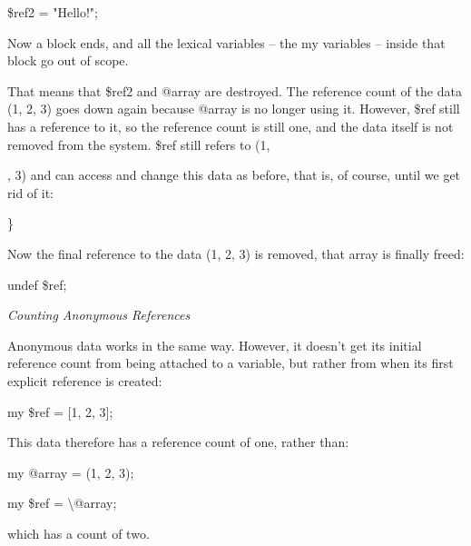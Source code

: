 \documentclass[a4paper,11pt]{book}
\begin{document}
\noindent 

\noindent \$ref2 = "Hello!";

\noindent 

\noindent 

\noindent Now a block ends, and all the lexical variables -- the my variables -- inside that block go out of scope.

\noindent That means that \$ref2 and @array are destroyed. The reference count of the data (1, 2, 3) goes down again because @array is no longer using it. However, \$ref still has a reference to it, so the reference count is still one, and the data itself is not removed from the system. \$ref still refers to (1,

, 3) and can access and change this data as before, that is, of course, until we get rid of it:

\noindent 

\noindent 

\noindent \}

\noindent 

\noindent Now the final reference to the data (1, 2, 3) is removed, that array is finally freed:

\noindent 

\noindent 

\noindent undef \$ref;

\noindent 

\noindent \textit{Counting Anonymous References}

\noindent Anonymous data works in the same way. However, it doesn't get its initial reference count from being attached to a variable, but rather from when its first explicit reference is created:

\noindent 

\noindent 

\noindent my \$ref = [1, 2, 3];

\noindent 

\noindent This data therefore has a reference count of one, rather than:

\noindent 

\noindent 

\noindent my @array = (1, 2, 3);

\noindent my \$ref = \textbackslash @array;

\noindent 

\noindent which has a count of two.

\noindent 

\noindent 
\end{document}
